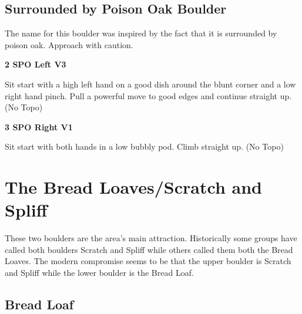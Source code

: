 \begin{multicols}{2}
\begin{minipage}{\columnwidth}
			\subsection*{Surrounded by Poison Oak Boulder}\label{bf:Surrounded by Poison Oak Boulder}
			The name for this boulder was inspired by the fact that it is surrounded by poison oak. Approach with caution.
			
			\end{minipage}
			
					\begin{minipage}{\linewidth}	
					\label{rt:SPO Left}
\colorbox{green!20}{
\parbox{0.95\textwidth}{
\textbf{
2 SPO Left V3   
}
}
}

					\begin{adjustwidth}{0.5cm}{}				
					Sit start with a high left hand on a good dish around the blunt corner and a low right hand pinch. Pull a powerful move to good edges and continue straight up.
						\newline (No Topo) 
					\end{adjustwidth}
					\end{minipage}
					\begin{minipage}{\linewidth}	
					\label{rt:SPO Right}
\colorbox{green!20}{
\parbox{0.95\textwidth}{
\textbf{
3 SPO Right V1   
}
}
}

					\begin{adjustwidth}{0.5cm}{}				
					Sit start with both hands in a low bubbly pod. Climb straight up.
						\newline (No Topo) 
					\end{adjustwidth}
					\end{minipage}
\newpage
		\section{The Bread Loaves/Scratch and Spliff}\label{sa:The Bread Loaves/Scratch and Spliff}
	\begin{minipage}{\columnwidth}
	These two boulders are the area's main attraction. Historically some groups have called both boulders Scratch and Spliff while others called them both the Bread Loaves. The modern compromise seems to be that the upper boulder is Scratch and Spliff while the lower boulder is the Bread Loaf.
	\end{minipage}
	
			\begin{minipage}{\columnwidth}
			\subsection*{Bread Loaf}\label{bf:Bread Loaf}
			\
			

\end{minipage}
\end{multicols}
